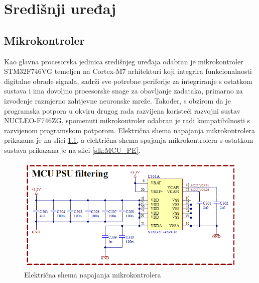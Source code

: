 \chapter{Središnji uređaj}
\label{pog:mainboard}

\section{Mikrokontroler}
\sloppy Kao glavna procesorska jedinica središnjeg uređaja odabran je mikrokontroler STM32F746VG temeljen na Cortex-M7 arhitekturi koji integrira funkcionalnosti digitalne obrade signala, sadrži sve potrebne periferije za integriranje s ostatkom sustava i ima dovoljno procesorske snage za obavljanje zadataka, primarno za izvođenje razmjerno zahtjevne neuronske mreže. Također, s obzirom da je programska potpora u okviru drugog rada razvijena koristeći razvojni sustav NUCLEO-F746ZG, spomenuti mikrokontroler odabran je radi kompatibilnosti s razvijenom programskom potporom. Električna shema napajanja mikrokontrolera prikazana je na slici \ref{slk:MCU_PS}, a električna shema spajanja mikrokontrolera s ostatkom sustava prikazana je na slici \ref{slk:MCU_PE}.
\begin{figure}[!htb]
    \centering
    \includegraphics[width=10 cm]{Figures/MCU_02.png}
    \caption{Električna shema napajanja mikrokontrolera}
    \label{slk:MCU_PS}
\end{figure}

